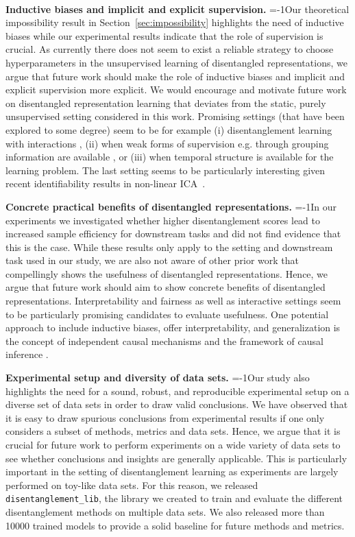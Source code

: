 \documentclass{article}
\begin{document}
~

\newpage
\textbf{Inductive biases and implicit and explicit supervision.}
\looseness=-1Our theoretical impossibility result in Section~\ref{sec:impossibility} highlights the need of inductive biases while our experimental results indicate that the role of supervision is crucial. As currently there does not seem to exist a reliable strategy to choose hyperparameters in the unsupervised learning of disentangled representations, we argue that future work should make the role of inductive biases and implicit and explicit supervision more explicit.
We would encourage and motivate future work on disentangled representation learning that deviates from the static, purely unsupervised setting considered in this work.
Promising settings (that have been explored to some degree) seem to be for example (i) disentanglement learning with interactions \citep{thomas2018disentangling}, (ii) when weak forms of supervision e.g. through grouping information are available \citep{bouchacourt2017multi}, or (iii) when temporal structure is available for the learning problem.
The last setting seems to be particularly interesting given recent identifiability results in non-linear ICA~\citep{hyvarinen2016unsupervised}.

\textbf{Concrete practical benefits of disentangled representations.}
\looseness=-1In our experiments we investigated whether higher disentanglement scores lead to increased sample efficiency for downstream tasks and did not find evidence that this is the case.
While these results only apply to the setting and downstream task used in our study, we are also not aware of other prior work that compellingly shows the usefulness of disentangled representations.
Hence, we argue that future work should aim to show concrete benefits of disentangled representations.
Interpretability and fairness as well as interactive settings seem to be particularly promising candidates to evaluate usefulness. 
One potential approach to include inductive biases, offer interpretability, and generalization is the concept of independent causal mechanisms and the framework of causal inference \citep{pearl2009causality, peters2017elements}.

\textbf{Experimental setup and diversity of data sets.}
\looseness=-1Our study also highlights the need for a sound, robust, and reproducible experimental setup on a diverse set of data sets in order to draw valid conclusions.
We have observed that it is easy to draw spurious conclusions from experimental results if one only considers a subset of methods, metrics and data sets. Hence,
we argue that it is crucial for future work to perform experiments on a wide variety of data sets to see whether conclusions and insights are generally applicable.
This is particularly important in the setting of disentanglement learning as experiments are largely performed on toy-like data sets.  
For this reason, we released \texttt{disentanglement\_lib}, the library we created to train and evaluate the different disentanglement methods on multiple data sets. 
We also released more than \num{10000} trained models to provide a solid baseline for future methods and metrics.
\end{document}
